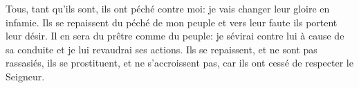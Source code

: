Tous, tant qu’ils sont, ils ont péché contre moi:
	je vais changer leur gloire en infamie.
Ils se repaissent du péché de mon peuple
	et vers leur faute ils portent leur désir.
Il en sera du prêtre comme du peuple:
	je sévirai contre lui à cause de sa conduite et je lui revaudrai ses actions.
Ils se repaissent, et ne sont pas rassasiés,
	ils se prostituent, et ne s’accroissent pas,
	car ils ont cessé de respecter le Seigneur.
